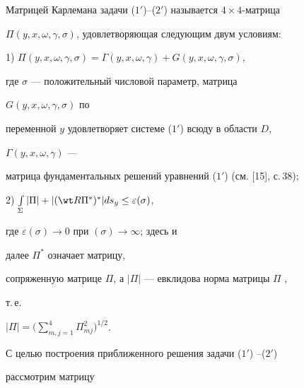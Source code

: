 


\begin{defn} 


Матрицей Карлемана задачи ($1'$)--($2'$) называется $4\times4$-матрица 


$\Pi(y,x,\omega,\gamma,\sigma)$, удовлетворяющая следующим двум условиям: 


 


1) $\Pi(y,x,\omega,\gamma,\sigma)=\Gamma(y,x,\omega,\gamma)+ 


G(y,x,\omega,\gamma,\sigma)$, 


 


\noindent{}где $\sigma$ --- положительный числовой параметр, матрица 


$G(y,x,\omega,\gamma,\sigma)$ по 


переменной $y$ удовлетворяет системе ($1'$) всюду в области $D$, 


$\Gamma(y,x,\omega,\gamma)$ --- 


матрица фундаментальных решений уравнений ($1'$) (см. [15], с.\,38); 


 


2) $\int\limits_\Sigma|\Pi|+|(\wt R\Pi^*)^*|ds_y\le\varepsilon(\sigma)$, 


 


\noindent{}где $\varepsilon(\sigma)\to0$ при $(\sigma)\to\infty$; здесь и 


далее $\Pi^*$ означает матрицу, 


сопряженную матрице $\Pi$, а $|\Pi|$ --- евклидова норма матрицы $\Pi$ , 


т.\,е. 


$|\Pi|=\Big(\sum\limits^4_{m,j=1}\Pi^2_{mj}\Big)^{1/2}$. 


\end{defn}





 


С целью построения приближенного решения задачи ($1'$) --($2'$) 


рассмотрим матрицу 


